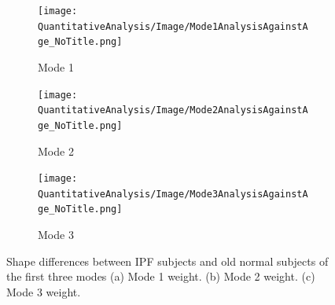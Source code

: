 \begin{figure}[htbp] 
\centering
\begin{subfigure}{.65\linewidth}%
  \texttt{[image: QuantitativeAnalysis/Image/Mode1AnalysisAgainstAge\_NoTitle.png]} %
  \caption{Mode 1}
  \label{fig:ShapeDifference-a} 
\end{subfigure} 
\begin{subfigure}{.65\linewidth}%
  \texttt{[image: QuantitativeAnalysis/Image/Mode2AnalysisAgainstAge\_NoTitle.png]}
  \caption{Mode 2}
  \label{fig:ShapeDifference-b}
\end{subfigure}
\begin{subfigure}{.65\linewidth}%
  \texttt{[image: QuantitativeAnalysis/Image/Mode3AnalysisAgainstAge\_NoTitle.png]}
  \caption{Mode 3}
  \label{fig:ShapeDifference-c}
\end{subfigure}
\caption{ Shape differences between IPF subjects and old normal subjects of the first three modes (a) Mode 1 weight. (b) Mode 2 weight. (c) Mode 3  weight.}
\label{fig:ShapeDifference}
\end{figure}


